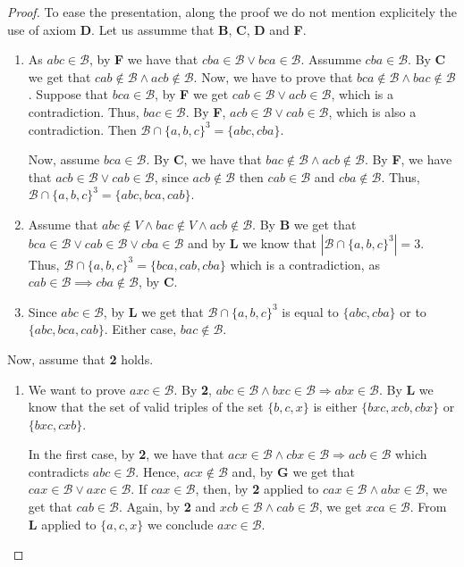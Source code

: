 \documentclass[10pt,a4paper]{amsart}
\newcommand{\calb}{\mathcal{B}}
\begin{document}
\begin{proof}
	To ease the presentation, along the proof we do not mention explicitely the use of axiom \textbf{D}. Let us assumme that \textbf{B}, \textbf{C}, \textbf{D} and \textbf{F}. 

	\begin{enumerate}
		\item[\textbf{L}\,] As $abc\in\calb$, by \textbf{F} we have that $cba\in\calb\lor bca\in\calb$. Assumme $cba\in\calb$.   By \textbf{C} we get that $cab\notin\calb\land acb\notin\calb$. Now, we have to prove that $ bca\notin\calb\land bac\notin\calb$. Suppose that $bca\in\calb$, by \textbf{F} we get $cab\in\calb\lor acb\in\calb$, which is a contradiction. Thus, $bac\in\calb$.   By \textbf{F}, $acb\in\calb\lor cab\in\calb$, which is also a contradiction. Then  $ \calb\cap \{a,b,c\}^3=\{abc,cba\}$.
	
		Now, assume $bca\in\calb$.   By \textbf{C}, we have that $ bac\notin\calb\land acb\notin\calb$.   By \textbf{F}, we have that $acb\in\calb\lor cab\in\calb$, since $acb\notin\calb$ then $cab\in\calb$ and $ cba\notin\calb$. Thus, $ \calb\cap\{a,b,c\}^3=\{abc,bca,cab\}$.
        
		\item[\textbf{G}\,] Assume that $ abc\notin V \land bac\notin V\land acb\notin\calb$.   By $\textbf{B}$ we get that $bca\in\calb\lor cab\in\calb\lor cba\in\calb$ and by \textbf{L} we know that $| \calb\cap \{a,b,c\}^3|=3$. Thus, $ \calb\cap \{a,b,c\}^3=\{bca,cab,cba\}$ which is a contradiction, as $cab\in\calb\implies cba\notin\calb$, by \textbf{C}.
	 
		\item[\textbf{C'}\,] Since $abc\in\calb$, by \textbf{L}  we get that $ \calb\cap \{a,b,c\}^3$ is equal to  $\{abc,cba\}$ or to $\{abc,bca,cab\}$. Either case, $bac\notin\calb$.
        	\end{enumerate}

	Now, assume that \textbf{2} holds.
	\begin{enumerate}
		\item[\textbf{3}\,] We want to prove $axc\in\calb$.   By \textbf{2}, $abc\in\calb\land bxc\in\calb\Rightarrow abx\in\calb$.  By \textbf{L} we know that the set of valid triples of the set $\{b,c,x\}$ is either $\{bxc,xcb,cbx\}$ or $\{bxc,cxb\}$. %
	
		In the first case, by \textbf{2}, we have that $acx\in\calb\land cbx\in\calb \Rightarrow acb\in\calb$ which contradicts $abc\in\calb$. Hence, $acx\notin\calb$ and, by \textbf{G} we get that $cax\in\calb\lor axc\in\calb$. If $cax\in\calb$, then, by \textbf{2} applied to $cax\in\calb\land abx\in\calb$, we get that $cab\in\calb$. Again, by \textbf{2} and $xcb\in\calb\land cab\in\calb$, we get $xca\in\calb$. From \textbf{L} applied to $\{a,c,x\}$ we conclude $axc\in\calb$. 
	

\end{enumerate}
\end{proof}
\end{document}
